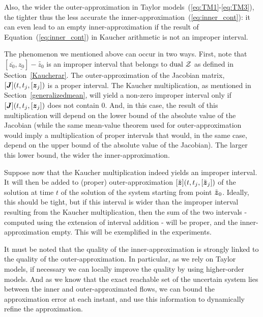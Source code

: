 \documentclass{sig-alternate-05-2015}
\newcommand{\dual}{\mbox{dual }}
\begin{document}
Also, the wider the outer-approximation in Taylor models~(\ref{eq:TM1}-\ref{eq:TM3}), the tighter thus the less accurate the inner-approximation~(\ref{eq:inner_cont}): 
it can even  lead to an empty inner-approximation if the result of Equation~(\ref{eq:inner_cont}) in Kaucher arithmetic is not an improper interval. 

The phenomenon we mentioned above can occur in two ways. First, note that $[\overline{z_0},\underline{z_0}]-\tilde{z_0}$ is an improper interval that belongs to $\dual {\cal Z}$ as defined 
in Section~\ref{Kaucherar}. The outer-approximation of the Jacobian matrix,  $[\J](t,t_j,[{\z}_j])$ is a proper interval. The Kaucher multiplication, as mentioned 
in Section~\ref{generalizedmean},
will yield a non-zero improper interval only if $[\J](t,t_j,[{\z}_j])$ does not contain $0$. And, in this case, the result of this multiplication will depend on the 
lower bound of the absolute value of the Jacobian (while the same mean-value theorem used for outer-approximation would imply a multiplication of proper intervals that would, 
in the same case, depend on the upper bound of the absolute value of the Jacobian). The larger this lower bound, the wider the inner-approximation. 

Suppose now that the Kaucher multiplication indeed yields an improper interval. It will then be added to (proper) outer-approximation  $[\tilde{\z}](t,t_j,[\tilde{\z}_j])$ 
of the solution at time $t$ of the solution of the system starting from point $\tilde{\z}_0$. Ideally, this should be tight, but if this interval is wider than the improper 
interval resulting from the Kaucher multiplication, then the sum of the two intervals - computed using the extension of interval addition - will be proper, 
and the inner-approximation empty. This will be exemplified in the experiments. 


It must be noted that the quality of the inner-approxima\-tion is strongly linked to the quality of the outer-approxima\-tion. 
In particular, as we rely on Taylor models, if necessary we can locally improve the quality by using higher-order models. 
And as we know that the exact reachable set of the uncertain system lies between the inner and outer-approximated flows, 
we can bound the approximation error at each instant, and use this information to dynamically refine the approximation.  
\end{document}
